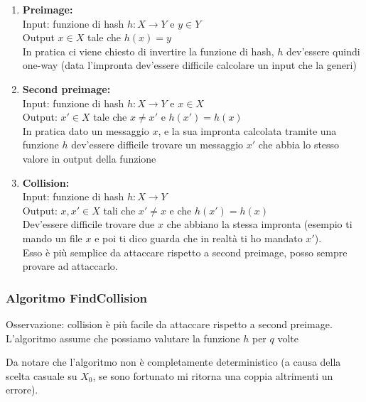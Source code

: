 \begin{enumerate}
	\item \textbf{Preimage:}\\
	Input: funzione di hash $h : X \rightarrow Y$ e $y \in Y$\\
	Output $x \in X$ tale che $h(x) = y$\\
	
	In pratica ci viene chiesto di invertire la funzione di hash, $h$ dev'essere quindi one-way (data l'impronta dev'essere difficile calcolare un input che la generi)
	
	\item \textbf{Second preimage:}\\
	Input: funzione di hash $h : X\rightarrow Y$ e $x \in X$\\
	Output:  $x' \in X$ tale che $x \neq x'$ e $h(x') = h(x)$\\
	
	In pratica dato un messaggio $x$, e la sua impronta calcolata tramite una funzione $h$ dev'essere difficile trovare un messaggio $x'$ che abbia lo stesso valore in output della funzione
	
	\item \textbf{Collision:}\\
	Input: funzione di hash $h: X \rightarrow Y$\\
	Output: $x, x' \in X$ tali che $x' \neq x$ e che $h(x') = h(x)$\\
	
	Dev'essere difficile trovare due $x$ che abbiano la stessa impronta (esempio ti mando un file $x$ e poi ti dico guarda che in realtà ti ho mandato $x'$).\\
	Esso è più semplice da attaccare rispetto a second preimage, posso sempre provare ad attaccarlo.
\end{enumerate}

\subsubsection*{Algoritmo FindCollision}

Osservazione: collision è più facile da attaccare rispetto a second preimage. L'algoritmo assume che possiamo valutare la funzione $h$ per $q$ volte

\medskip
\begin{algorithmic}
	\EndFor
	\Else {}
	\EndIf
\end{algorithmic}
\medskip

Da notare che l'algoritmo non è completamente deterministico (a causa della scelta casuale su $X_0$, se sono fortunato mi ritorna una coppia altrimenti un errore).

